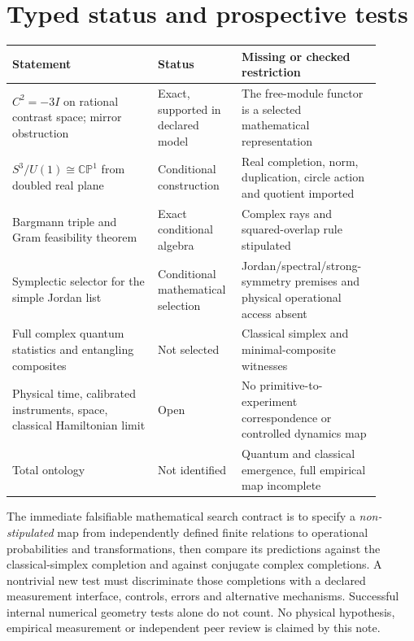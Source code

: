 \documentclass[10pt,letterpaper]{article}
\newcommand{\CP}{\mathbb{CP}}
\begin{document}
\section{Typed status and prospective tests}
\begin{center}\small
\begin{tabular}{p{0.37\linewidth}p{0.19\linewidth}p{0.34\linewidth}}
\toprule
Statement & Status & Missing or checked restriction\\\midrule
$C^2=-3I$ on rational contrast space; mirror obstruction & Exact, supported in declared model & The free-module functor is a selected mathematical representation\\
$S^3/U(1)\cong\CP^1$ from doubled real plane & Conditional construction & Real completion, norm, duplication, circle action and quotient imported\\
Bargmann triple and Gram feasibility theorem & Exact conditional algebra & Complex rays and squared-overlap rule stipulated\\
Symplectic selector for the simple Jordan list & Conditional mathematical selection & Jordan/spectral/strong-symmetry premises and physical operational access absent\\
Full complex quantum statistics and entangling composites & Not selected & Classical simplex and minimal-composite witnesses\\
Physical time, calibrated instruments, space, classical Hamiltonian limit & Open & No primitive-to-experiment correspondence or controlled dynamics map\\
Total ontology & Not identified & Quantum and classical emergence, full empirical map incomplete\\
\bottomrule
\end{tabular}\end{center}
The immediate falsifiable mathematical search contract is to specify a \emph{non-stipulated} map from independently defined finite relations to operational probabilities and transformations, then compare its predictions against the classical-simplex completion and against conjugate complex completions.  A nontrivial new test must discriminate those completions with a declared measurement interface, controls, errors and alternative mechanisms.  Successful internal numerical geometry tests alone do not count.  No physical hypothesis, empirical measurement or independent peer review is claimed by this note.
\end{document}
